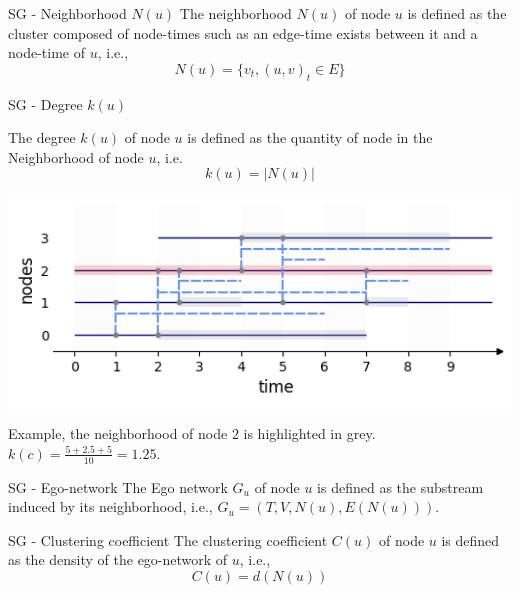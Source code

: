 \documentclass[a4paper,11pt]{book}
\begin{document}
\begin{textbox}{SG - Neighborhood $N(u)$}
The neighborhood $N(u)$ of node $u$ is defined as the cluster composed of node-times such as an edge-time exists between it and a node-time of $u$, i.e., 
\[
N(u)= \{v_t,(u,v)_t \in E\}
\]

\end{textbox}





\begin{textbox}{SG - Degree $k(u)$}


The degree $k(u)$ of node $u$ is defined as the quantity of node in the Neighborhood of node $u$, i.e. 
\[
k(u)=|N(u)|
\]


\centering
\colorbox{white}{\includegraphics[width=0.7\linewidth]{pics/dynamic/neighborhood.png}}

Example, the neighborhood of node $2$ is highlighted in grey. \\$k(c)=\frac{5+2.5+5}{10}=1.25$.


\end{textbox}





\begin{textbox}{SG - Ego-network}
The Ego network $G_u$ of node $u$ is defined as the substream induced by its neighborhood, i.e., $G_u=(T,V,N(u),E(N(u)))$.


\end{textbox}





\begin{textbox}{SG - Clustering coefficient}
The clustering coefficient $C(u)$ of node $u$ is defined as the density of the ego-network of $u$, i.e., 
\[
C(u)=d(N(u))
\]

\end{textbox}
\end{document}
